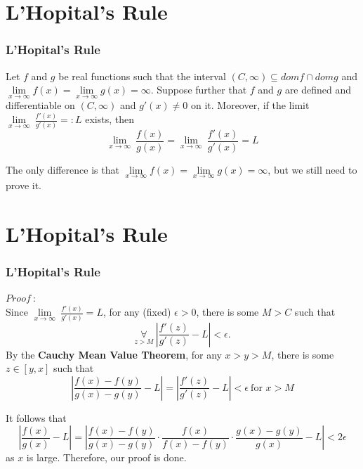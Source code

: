 \documentclass[12pt, t]{beamer}
\begin{document}
\section{L'Hopital's Rule}
\begin{frame}
    \frametitle{L'Hopital's Rule}
    Let $f$ and $g$ be real functions such that the interval $(C,\infty)\subseteq domf\cap domg$ and
    $\underset{x\rightarrow \infty }{\lim}f(x)=\underset{x\rightarrow \infty }{\lim}g(x)=\infty$. Suppose further that $f$ and $g$ are defined
    and differentiable on $(C,\infty)$ and $g'(x)\neq 0$ on it. Moreover, if the limit $\underset{x\rightarrow \infty }{\lim}\ \frac{f'(x)}{g'(x)}=:L$ exists, then
    \begin{equation*}
        \underset{x\rightarrow\infty}{\lim}\ \frac{f(x)}{g(x)}=\underset{x\rightarrow\infty}{\lim}\ \frac{f'(x)}{g'(x)}=L
    \end{equation*}

    \vspace{0.5em}
    \hspace{1em}
    The only difference is that $\underset{x\rightarrow\infty}{\lim}f(x)=\underset{x\rightarrow \infty }{\lim}g(x)=\infty$, but we still need to
    prove it.


\end{frame}

\section{L'Hopital's Rule}
\begin{frame}
    \frametitle{L'Hopital's Rule}
    $Proof\ :$\\
    \hspace{1em}
    Since $\underset{x\rightarrow \infty }{\lim}\ \frac{f'(x)}{g'(x)}=L$, for any (fixed) $\epsilon>0$, there is some $M>C$ such that
    \begin{equation*}
        \underset{z>M}{\forall}\ |\frac{f'(z)}{g'(z)}-L|<\epsilon.
    \end{equation*}
    By the \textbf{Cauchy Mean Value Theorem}, for any $x>y>M$, there is some $z\in[y,x]$ such that
    \begin{equation*}
        |\frac{f(x)-f(y)}{g(x)-g(y)}-L|=|\frac{f'(z)}{g'(z)}-L|<\epsilon\ \text{for }x>M
    \end{equation*}

    It follows that
    \begin{equation*}
        |\frac{f(x)}{g(x)}-L|=|\frac{f(x)-f(y)}{g(x)-g(y)}\cdot\frac{f(x)}{f(x)-f(y)}\cdot\frac{g(x)-g(y)}{g(x)}-L|<2\epsilon
    \end{equation*}
    as $x$ is large. Therefore, our proof is done.



\end{frame}
\end{document}
